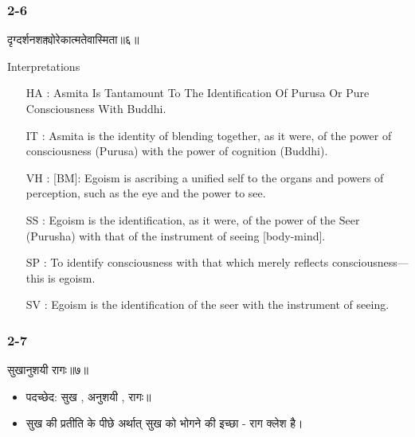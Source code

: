 \begin{frame}[fragile]\frametitle{2-6}
\begin{sanskrit}
दृग्दर्शनशक्त्योरेकात्मतेवास्मिता॥६॥
\end{sanskrit}

Interpretations
\begin{itemize}
\item [HA]: Asmita Is Tantamount To The Identification Of Purusa Or Pure Consciousness With Buddhi.
\item [IT]: Asmita is the identity of blending together, as it were, of the power of consciousness (Purusa) with the power of cognition (Buddhi).
\item [VH]: [BM]: Egoism is ascribing a unified self to the organs and powers of perception, such as the eye and the power to see.
\item [SS]: Egoism is the identification, as it were, of the power of the Seer (Purusha) with that of the instrument of seeing [body-mind].
\item [SP]: To identify consciousness with that which merely reflects consciousness—this is egoism.
\item [SV]: Egoism is the identification of the seer with the instrument of seeing. 
\end{itemize}
	
\end{frame}



\begin{frame}[fragile]\frametitle{2-7}
\begin{sanskrit}
सुखानुशयी रागः॥७॥
\end{sanskrit}

\begin{itemize}
\item पदच्छेद: सुख , अनुशयी , रागः॥
\item सुख की प्रतीति के पीछे अर्थात् सुख को भोगने की इच्छा - राग क्लेश है।
\end{itemize}
	
\end{frame}

